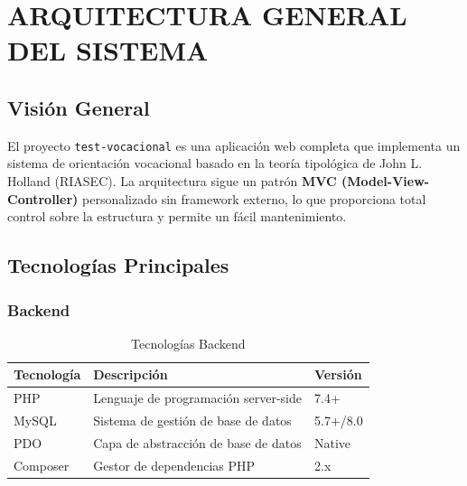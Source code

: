\documentclass[12pt, a4paper]{report}
\begin{document}
\listoffigures
\newpage

\listoftables
\newpage

\chapter{ARQUITECTURA GENERAL DEL SISTEMA}

\section{Visión General}
El proyecto \texttt{test-vocacional} es una aplicación web completa que implementa un sistema de orientación vocacional basado en la teoría tipológica de John L. Holland (RIASEC). La arquitectura sigue un patrón \textbf{MVC (Model-View-Controller)} personalizado sin framework externo, lo que proporciona total control sobre la estructura y permite un fácil mantenimiento.

\section{Tecnologías Principales}

\subsection{Backend}
\begin{table}[H]
\centering
\begin{tabularx}{\textwidth}{|l|X|l|}
\hline
\textbf{Tecnología} & \textbf{Descripción} & \textbf{Versión} \\
\hline
PHP & Lenguaje de programación server-side & 7.4+ \\
MySQL & Sistema de gestión de base de datos & 5.7+/8.0 \\
PDO & Capa de abstracción de base de datos & Native \\
Composer & Gestor de dependencias PHP & 2.x \\
\hline
\end{tabularx}
\caption{Tecnologías Backend}
\end{table}
\end{document}
